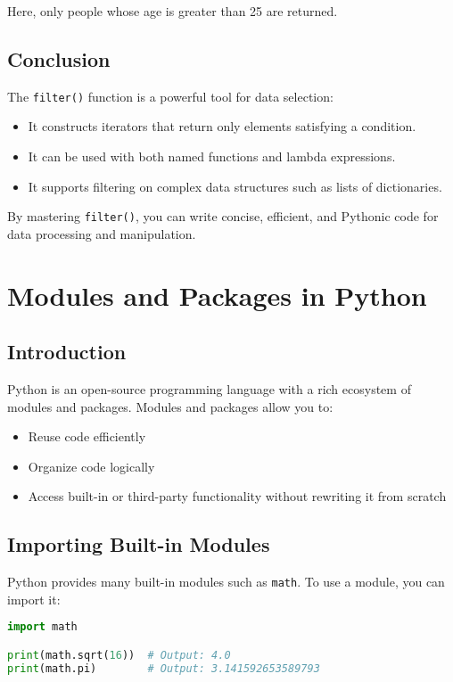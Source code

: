 Here, only people whose age is greater than 25 are returned.

\section{Conclusion}
The \texttt{filter()} function is a powerful tool for data selection:
\begin{itemize}
    \item It constructs iterators that return only elements satisfying a condition.
    \item It can be used with both named functions and lambda expressions.
    \item It supports filtering on complex data structures such as lists of dictionaries.
\end{itemize}

By mastering \texttt{filter()}, you can write concise, efficient, and Pythonic code for data processing and manipulation.

\chapter{Modules and Packages in Python}

\section{Introduction}
Python is an open-source programming language with a rich ecosystem of modules and packages.  
Modules and packages allow you to:
\begin{itemize}
    \item Reuse code efficiently
    \item Organize code logically
    \item Access built-in or third-party functionality without rewriting it from scratch
\end{itemize}

\section{Importing Built-in Modules}
Python provides many built-in modules such as \texttt{math}. To use a module, you can import it:

\begin{lstlisting}[language=Python, caption={Basic import}]
import math

print(math.sqrt(16))  # Output: 4.0
print(math.pi)        # Output: 3.141592653589793
\end{lstlisting}

